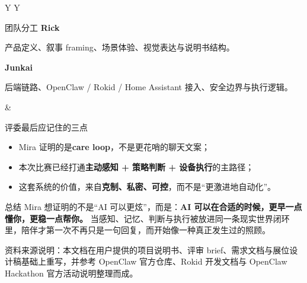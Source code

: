 \documentclass[11pt,fontset=none]{ctexart}
\begin{document}
\vspace{24mm}
\begin{tabularx}{\linewidth}{Y Y}
\begin{card}{团队分工}
\textbf{Rick}\par
产品定义、叙事 framing、场景体验、视觉表达与说明书结构。\par\vspace{0.3em}
\textbf{Junkai}\par
后端链路、OpenClaw / Rokid / Home Assistant 接入、安全边界与执行逻辑。
\end{card}
&
\begin{card}{评委最后应记住的三点}
\begin{itemize}
  \item Mira 证明的是\textbf{care loop}，不是更花哨的聊天文案；
  \item 本次比赛已经打通\textbf{主动感知 + 策略判断 + 设备执行}的主路径；
  \item 这套系统的价值，来自\textbf{克制、私密、可控}，而不是“更激进地自动化”。
\end{itemize}
\end{card}
\end{tabularx}

\vspace{2mm}
\begin{accentcard}{总结}
Mira 想证明的不是“AI 可以更炫”，而是：\textbf{AI 可以在合适的时候，更早一点懂你，更稳一点帮你。} 当感知、记忆、判断与执行被放进同一条现实世界闭环里，陪伴才第一次不再只是一句回复，而开始像一种真正发生过的照顾。
\end{accentcard}

\vfill
{\footnotesize\color{MiraGray}资料来源说明：本文档在用户提供的项目说明书、评审 brief、需求文档与展位设计稿基础上重写，并参考 OpenClaw 官方仓库、Rokid 开发文档与 OpenClaw Hackathon 官方活动说明整理而成。}
\end{document}
